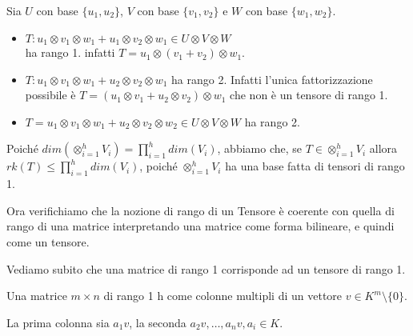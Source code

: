 \documentclass[10pt,a4paper,twoside]{book}
\begin{document}
\begin{example}
    Sia $U$ con base $\{u_1, u_2\}$, $V$ con base $\{v_1, v_2\}$ e $W$ con base $\{w_1, w_2\}$.
    \begin{itemize}
        \item $T: u_1 \otimes v_1 \otimes w_1 + u_1 \otimes v_2 \otimes w_1  \in U \otimes V  \otimes W$\\
              ha rango 1. infatti $T = u_1 \otimes (v_1 + v_2 )\otimes w_1$.
        \item $T: u_1 \otimes v_1 \otimes w_1 + u_2 \otimes v_2 \otimes w_1$ ha rango 2.
              Infatti l'unica fattorizzazione possibile è $T = (u_1 \otimes v_1  + u_2 \otimes v_2) \otimes w_1$ che non è un tensore di rango 1.
        \item $T = u_1 \otimes v_1 \otimes w_1 + u_2 \otimes v_2 \otimes w_2 \in U \otimes V \otimes W $ ha rango 2.
    \end{itemize}
\end{example}

Poiché $dim(\otimes_{i=1}^{h} V_i) = \prod_{i=1}^{h} dim(V_i)$, abbiamo che, se $T \in \otimes_{i=1}^{h} V_i$ allora $rk(T) \leq \prod_{i=1}^{h} dim(V_i)$, poiché $\otimes_{i=1}^{h} V_i$ ha una base fatta di tensori di rango 1.

Ora verifichiamo che la nozione di rango di un Tensore è coerente con quella di rango di una matrice interpretando una matrice come forma bilineare, e quindi come un tensore.

Vediamo subito che una matrice di rango 1 corrisponde ad un tensore di rango 1.

Una matrice $m \times n$ di rango 1 h come colonne multipli di un vettore $v \in K^m \setminus \{0\}$.

La prima colonna sia $a_1v$, la seconda $a_2v, \ldots , a_nv, a_i \in K$.
\end{document}
